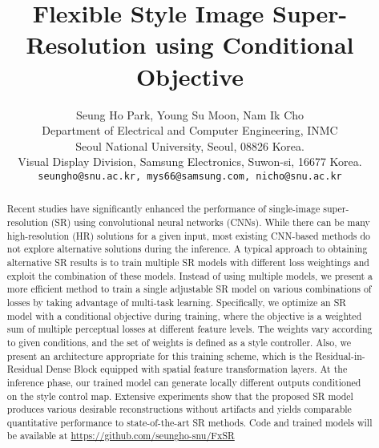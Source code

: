 \documentclass{article}
\title{Flexible Style Image Super-Resolution using Conditional Objective
}
\author{
  Seung Ho Park, Young Su Moon, Nam Ik Cho \\
  Department of Electrical and Computer Engineering, INMC\\
Seoul National University, Seoul, 08826 Korea.\\
  Visual Display Division, Samsung Electronics, Suwon-si, 16677 Korea.\\
  \texttt{seungho@snu.ac.kr, mys66@samsung.com, nicho@snu.ac.kr}\\
}
\begin{document}
\maketitle


\begin{abstract}
Recent studies have significantly enhanced the performance of single-image super-resolution (SR) using convolutional neural networks (CNNs). While there can be many high-resolution (HR) solutions for a given input, most existing CNN-based methods do not explore alternative solutions during the inference. A typical approach to obtaining alternative SR results is to train multiple SR models with different loss weightings and exploit the combination of these models. Instead of using multiple models, we present a more efficient method to train a single adjustable SR model on various combinations of losses by taking advantage of multi-task learning. Specifically, we optimize an SR model with a conditional objective during training, where the objective is a weighted sum of multiple perceptual losses at different feature levels. The weights vary according to given conditions, and the set of weights is defined as a style controller. Also, we present an architecture appropriate for this training scheme, which is the Residual-in-Residual Dense Block equipped with spatial feature transformation layers. At the inference phase, our trained model can generate locally different outputs conditioned on the style control map. Extensive experiments show that the proposed SR model produces various desirable reconstructions without artifacts and yields comparable quantitative performance to state-of-the-art SR methods. Code and trained models will be available at \href{https://github.com/seungho-snu/FxSR}{https://github.com/seungho-snu/FxSR}
\end{abstract}


\end{document}
